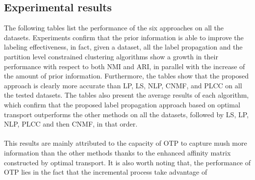 \documentclass[conference]{IEEEtran}
\begin{document}
\subsection{Experimental results}
The following tables list the performance of the six approaches on all the datasets. Experiments confirm that the prior information is able to improve the labeling effectiveness, in fact, given a dataset, all the label propagation and the partition level constrained clustering algorithms show a growth in their performance with respect to both NMI and ARI, in parallel with the increase of the amount of prior information. Furthermore, the tables show that the proposed approach is clearly more accurate than LP, LS, NLP, CNMF, and PLCC on all the tested datasets. The tables also present the average results of each algorithm, which confirm that the proposed label propagation approach based on optimal transport outperforms the other methods on all the datasets, followed by LS, LP, NLP, PLCC and then CNMF, in that order.
\\
\\ This results are mainly attributed to the capacity of OTP to capture mush more information than the other methods thanks to the enhanced affinity matrix constructed by optimal transport. It is also worth noting that, the performance of OTP lies in the fact that the incremental process take advantage of 
\newpage
\end{document}

